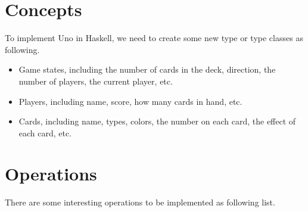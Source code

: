 \documentclass[letterpaper,12pt,fleqn]{article}
\begin{document}
\section*{Concepts}
To implement Uno in Haskell, we need to create some new type or type classes as following.
\begin{itemize}
\setlength{\itemsep}{0em}
	\item Game states, including the number of cards in the deck, direction, the number of players, the current player, etc.
	\item Players, including name, score, how many cards in hand, etc.
	\item Cards, including name, types, colors, the number on each card, the effect of each card, etc.
\end{itemize}


\section*{Operations}
There are some interesting operations to be implemented as following list.
\end{document}
